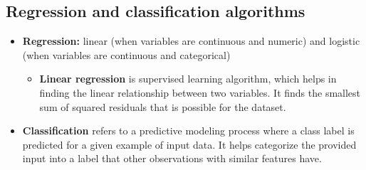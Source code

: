 \documentclass[
  letterpaper,
  DIV=11,
  numbers=noendperiod]{scrreprt}
\providecommand{\tightlist}{%
  \setlength{\itemsep}{0pt}\setlength{\parskip}{0pt}}\usepackage{longtable,booktabs,array}
\begin{document}
\hypertarget{regression-and-classification-algorithms}{%
\subsection{Regression and classification
algorithms}\label{regression-and-classification-algorithms}}

\begin{itemize}
\item
  \textbf{Regression:} linear (when variables are continuous and
  numeric) and logistic (when variables are continuous and categorical)

  \begin{itemize}
  \tightlist
  \item
    \textbf{Linear regression} is supervised learning algorithm, which
    helps in finding the linear relationship between two variables. It
    finds the smallest sum of squared residuals that is possible for the
    dataset.
  \end{itemize}
\item
  \textbf{Classification} refers to a predictive modeling process where
  a class label is predicted for a given example of input data. It helps
  categorize the provided input into a label that other observations
  with similar features have.


\end{itemize}
\end{document}
